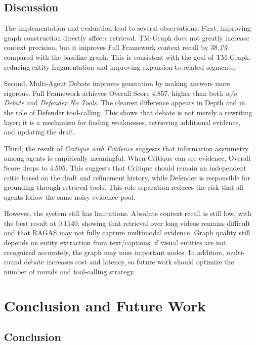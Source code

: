\documentclass[12pt,a4paper]{article}
\begin{document}
\subsection{Discussion}

The implementation and evaluation lead to several observations. First, improving graph construction directly affects retrieval. TM-Graph does not greatly increase context precision, but it improves Full Framework context recall by 38.1\% compared with the baseline graph. This is consistent with the goal of TM-Graph: reducing entity fragmentation and improving expansion to related segments.

Second, Multi-Agent Debate improves generation by making answers more rigorous. Full Framework achieves Overall Score 4.857, higher than both \textit{w/o Debate} and \textit{Defender No Tools}. The clearest difference appears in Depth and in the role of Defender tool-calling. This shows that debate is not merely a rewriting layer; it is a mechanism for finding weaknesses, retrieving additional evidence, and updating the draft.

Third, the result of \textit{Critique with Evidence} suggests that information asymmetry among agents is empirically meaningful. When Critique can see evidence, Overall Score drops to 4.595. This suggests that Critique should remain an independent critic based on the draft and refinement history, while Defender is responsible for grounding through retrieval tools. This role separation reduces the risk that all agents follow the same noisy evidence pool.

However, the system still has limitations. Absolute context recall is still low, with the best result at 0.1140, showing that retrieval over long videos remains difficult and that RAGAS may not fully capture multimodal evidence. Graph quality still depends on entity extraction from text/captions; if visual entities are not recognized accurately, the graph may miss important nodes. In addition, multi-round debate increases cost and latency, so future work should optimize the number of rounds and tool-calling strategy.

\section{Conclusion and Future Work}

\subsection{Conclusion}
\end{document}
